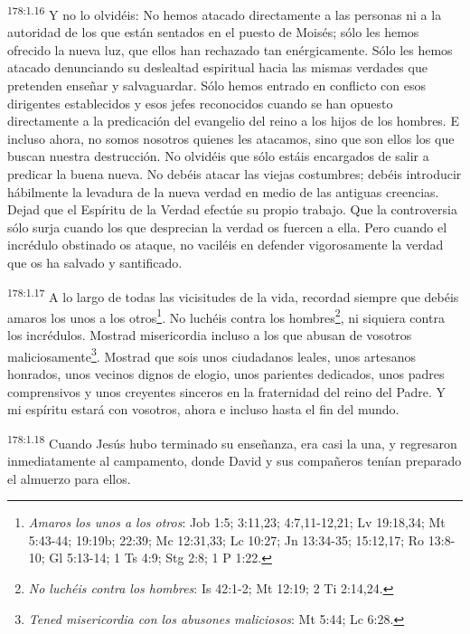 \par 
\textsuperscript{178:1.16} Y no lo olvidéis: No hemos atacado directamente a las personas ni a la autoridad de los que están sentados en el puesto de Moisés; sólo les hemos ofrecido la nueva luz, que ellos han rechazado tan enérgicamente. Sólo les hemos atacado denunciando su deslealtad espiritual hacia las mismas verdades que pretenden enseñar y salvaguardar. Sólo hemos entrado en conflicto con esos dirigentes establecidos y esos jefes reconocidos cuando se han opuesto directamente a la predicación del evangelio del reino a los hijos de los hombres. E incluso ahora, no somos nosotros quienes les atacamos, sino que son ellos los que buscan nuestra destrucción. No olvidéis que sólo estáis encargados de salir a predicar la buena nueva. No debéis atacar las viejas costumbres; debéis introducir hábilmente la levadura de la nueva verdad en medio de las antiguas creencias. Dejad que el Espíritu de la Verdad efectúe su propio trabajo. Que la controversia sólo surja cuando los que desprecian la verdad os fuercen a ella. Pero cuando el incrédulo obstinado os ataque, no vaciléis en defender vigorosamente la verdad que os ha salvado y santificado.

\par 
\textsuperscript{178:1.17} A lo largo de todas las vicisitudes de la vida, recordad siempre que debéis amaros los unos a los otros\footnote{\textit{Amaros los unos a los otros}: Job 1:5; 3:11,23; 4:7,11-12,21; Lv 19:18,34; Mt 5:43-44; 19:19b; 22:39; Mc 12:31,33; Lc 10:27; Jn 13:34-35; 15:12,17; Ro 13:8-10; Gl 5:13-14; 1 Ts 4:9; Stg 2:8; 1 P 1:22.}. No luchéis contra los hombres\footnote{\textit{No luchéis contra los hombres}: Is 42:1-2; Mt 12:19; 2 Ti 2:14,24.}, ni siquiera contra los incrédulos. Mostrad misericordia incluso a los que abusan de vosotros maliciosamente\footnote{\textit{Tened misericordia con los abusones maliciosos}: Mt 5:44; Lc 6:28.}. Mostrad que sois unos ciudadanos leales, unos artesanos honrados, unos vecinos dignos de elogio, unos parientes dedicados, unos padres comprensivos y unos creyentes sinceros en la fraternidad del reino del Padre. Y mi espíritu estará con vosotros, ahora e incluso hasta el fin del mundo.

\par 
\textsuperscript{178:1.18} Cuando Jesús hubo terminado su enseñanza, era casi la una, y regresaron inmediatamente al campamento, donde David y sus compañeros tenían preparado el almuerzo para ellos.

